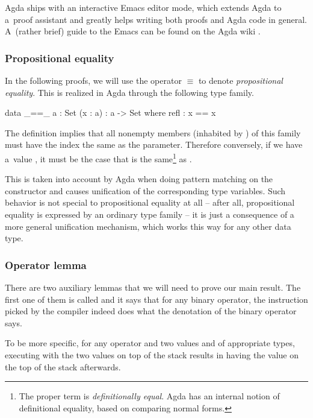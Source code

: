 Agda ships with an interactive Emacs editor mode, which extends Agda to a~proof
assistant and greatly helps writing both proofs and Agda code in general. A~(rather brief) guide
to the Emacs  can be found on the Agda wiki \cite{agda-mode}.

\subsubsection{Propositional equality}

In the following proofs, we will use the operator $\equiv$ to denote
\emph{propositional equality}. This is realized in Agda through the following
type family.

\begin{code}
  data _==_ {a : Set} (x : a) : a -> Set where
    refl : x == x
\end{code}

\noindent The definition implies that all nonempty members (inhabited by ) of this
family must have the index the same as the parameter.
Therefore conversely, if we have a~value , it must be the case that
 is the same\footnote{The proper term is \emph{definitionally equal}. Agda has an
internal notion of definitional equality, based on comparing normal forms.} as .

This is taken into account by Agda when doing pattern matching on the constructor
 and causes unification of the corresponding type variables. Such behavior is not special
to propositional equality at all -- after all, propositional equality is expressed by
an ordinary type family -- it is just a consequence of a more general unification mechanism,
which works this way for any other data type.

\subsubsection{Operator lemma}

There are two auxiliary lemmas that we will need to prove our main result. The
first one of them is called  and it says that for any binary
operator, the instruction picked by the compiler indeed does what the
denotation of the binary operator says.

To be more specific, for any operator  and two values  and
 of appropriate types, executing  with the two
values on top of the stack results in having the value 
on the top of the stack afterwards.

